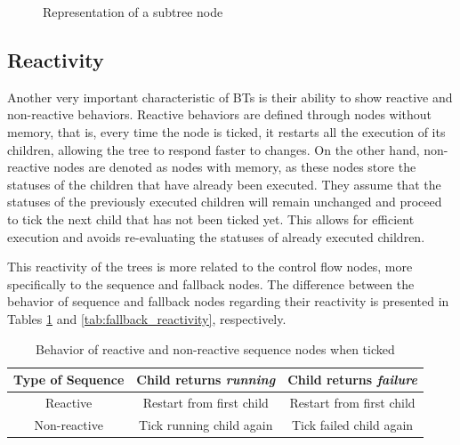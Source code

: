 \begin{figure}[!h]
    \centering
    \scalebox{.9} {
        \begin{forest}
        \end{forest}
    }
    \caption{Representation of a subtree node}
    \label{fig:background_subtree_node}
\end{figure}

\subsection{Reactivity}

Another very important characteristic of BTs is their ability to show reactive and non-reactive behaviors. Reactive behaviors are defined through nodes without memory, that is, every time the node is ticked, it restarts all the execution of its children, allowing the tree to respond faster to changes. On the other hand, non-reactive nodes are denoted as nodes with memory, as these nodes store the statuses of the children that have already been executed. They assume that the statuses of the previously executed children will remain unchanged and proceed to tick the next child that has not been ticked yet. This allows for efficient execution and avoids re-evaluating the statuses of already executed children.

This reactivity of the trees is more related to the control flow nodes, more specifically to the sequence and fallback nodes. The difference between the behavior of sequence and fallback nodes regarding their reactivity is presented in Tables \ref{tab:sequence_reactivity} and \ref{tab:fallback_reactivity}, respectively.

\begin{table}[h]
    \centering
    \begin{tabular}{c c c}
        \toprule
        Type of Sequence & Child returns \textit{running} & Child returns \textit{failure} \\
        \midrule
        Reactive         & Restart from first child       & Restart from first child       \\
        Non-reactive     & Tick running child again       & Tick failed child again        \\
        \bottomrule
    \end{tabular}
    \caption{Behavior of reactive and non-reactive sequence nodes when ticked}
    \label{tab:sequence_reactivity}
\end{table}


